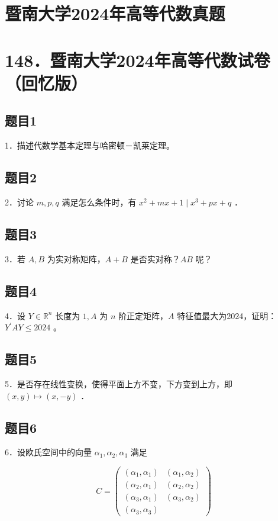 \documentclass{article}
\begin{document}
\section*{暨南大学2024年高等代数真题}
\section*{148．暨南大学2024年高等代数试卷（回忆版）}

\subsection{题目1}
1．描述代数学基本定理与哈密顿－凯莱定理。

\subsection{题目2}
2．讨论 \(m, p, q\) 满足怎么条件时，有 \(x^{2}+m x+1 \mid x^{3}+p x+q\) ．

\subsection{题目3}
3．若 \(A, B\) 为实对称矩阵，\(A+B\) 是否实对称？\(A B\) 呢？

\subsection{题目4}
4．设 \(Y \in \mathbb{R}^{n}\) 长度为 \(1, A\) 为 \(n\) 阶正定矩阵，\(A\) 特征值最大为2024，证明：\(Y^{\prime} A Y \leq 2024\) 。

\subsection{题目5}
5．是否存在线性变换，使得平面上方不变，下方变到上方，即 \((x, y) \mapsto(x,-y)\) ．

\subsection{题目6}
6．设欧氏空间中的向量 \(\alpha_{1}, \alpha_{2}, \alpha_{3}\) 满足

\[
C=\left(\begin{array}{ll}
\left(\alpha_{1}, \alpha_{1}\right) & \left(\alpha_{1}, \alpha_{2}\right) \\
\left(\alpha_{2}, \alpha_{1}\right) & \left(\alpha_{2}, \alpha_{2}\right) \\
\left(\alpha_{3}, \alpha_{1}\right) & \left(\alpha_{3}, \alpha_{2}\right) \\
\left(\alpha_{3}, \alpha_{3}\right)
\end{array}\right)
\]
\end{document}
